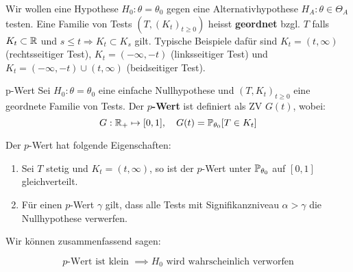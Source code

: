 
Wir wollen eine Hypothese $H_0 : \theta = \theta_0$ gegen eine Alternativhypothese $H_A : \theta \in \Theta_A$ testen. Eine Familie von Tests $(T, (K_t)_{t \geq 0})$ heisst \textbf{geordnet} bzgl. $T$ falls $K_t \subset \mathbb{R}$ und $s \leq t \Rightarrow K_t \subset K_s$ gilt. Typische Beispiele dafür sind $K_t = (t, \infty)$ (rechtsseitiger Test), $K_t = (-\infty, -t)$ (linksseitiger Test) und $K_t =  (-\infty, -t) \cup (t, \infty)$ (beidseitiger Test).

\begin{mainbox}{p-Wert}
    Sei $H_0: \theta = \theta_0$ eine einfache Nullhypothese und $(T, K_t)_{t \geq 0}$ eine geordnete Familie von Tests. Der \textbf{$p$-Wert} ist definiert als ZV $G(t)$, wobei:  
    $$G : \mathbb{R}_+ \mapsto [0,1], \quad G(t) = \mathbb{P}_{\theta_0}[T \in K_t]$$
\end{mainbox}

Der $p$-Wert hat folgende Eigenschaften:
\begin{subbox}{}
\begin{enumerate}
    \item Sei $T$ stetig und $K_t = (t, \infty)$, so ist der $p$-Wert unter $\mathbb{P}_{\theta_0}$ auf $[0,1]$ gleichverteilt.
    \item Für einen $p$-Wert $\gamma$ gilt, dass alle Tests mit Signifikanzniveau $\alpha > \gamma$ die Nullhypothese verwerfen.
\end{enumerate}
\end{subbox}

Wir können zusammenfassend sagen:
\begin{subbox}{}
    $$p\text{-Wert ist klein } \implies H_0 \text{ wird wahrscheinlich verworfen}$$
\end{subbox}

